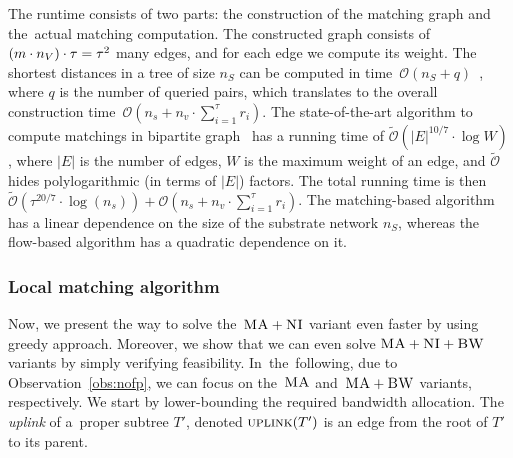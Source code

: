 The runtime consists of two parts: the construction of the matching graph and
the~actual matching computation. The constructed graph consists of
$(m \cdot n_V) \cdot \tau = \tau^2$
many edges,
and for each edge we compute its weight. The shortest distances
in a tree of size $n_S$ can be computed in time~$\mathcal{O}(n_S + q)$~\cite{offline-lca}, where $q$ is the number of queried pairs, which translates to the overall construction time~$\mathcal{O}(n_s + n_v\cdot \sum_{i=1}^\tau r_i)$.
The state-of-the-art algorithm to compute matchings in bipartite graph~\cite{matching-best} has a running time of $\tilde{\mathcal{O}}(|E|^{10/7}\cdot \log W)$, where $|E|$ is the number of edges, $W$ is the maximum weight of an edge, and $\tilde{\mathcal{O}}$ hides polylogarithmic (in terms of $|E|$) factors.
The total running time is then $\tilde{\mathcal{O}}(\tau^{20/7}\cdot \log(n_s)) + \mathcal{O}(n_s + n_v\cdot \sum_{i=1}^\tau r_i)$.
The matching-based algorithm has a linear dependence on the size of the substrate network $n_S$, whereas the flow-based algorithm has a quadratic dependence on it.


\subsubsection{Local matching algorithm}

Now, we present the way to solve the~$\textsc{MA}+\textsc{NI}$ variant even faster by using greedy approach.
Moreover, we show that we can
even solve
$\textsc{MA}+\textsc{NI}+\textsc{BW}$ variants by simply
verifying feasibility.
In~the~following, due to Observation~\ref{obs:nofp}, we can focus on
the~$\textsc{MA}$ and~$\textsc{MA}+\textsc{BW}$ variants, respectively.
We start by lower-bounding the required bandwidth allocation.
The \emph{uplink} of a~proper subtree $T'$, denoted $\textsc{uplink}(T')$ is an edge from the root of $T'$ to its parent.

%
%


